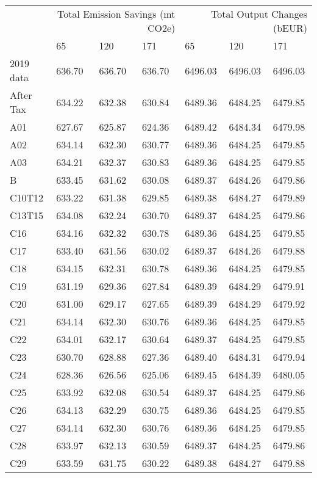 \begin{tabular}{lllllll}
\toprule
 & \multicolumn{3}{r}{Total Emission Savings (mt CO2e)} & \multicolumn{3}{r}{Total Output Changes (bEUR)} \\
 & 65 & 120 & 171 & 65 & 120 & 171 \\
\midrule
2019 data & 636.70 & 636.70 & 636.70 & 6496.03 & 6496.03 & 6496.03 \\
After Tax & 634.22 & 632.38 & 630.84 & 6489.36 & 6484.25 & 6479.85 \\
A01 & 627.67 & 625.87 & 624.36 & 6489.42 & 6484.34 & 6479.98 \\
A02 & 634.14 & 632.30 & 630.77 & 6489.36 & 6484.25 & 6479.85 \\
A03 & 634.21 & 632.37 & 630.83 & 6489.36 & 6484.25 & 6479.85 \\
B & 633.45 & 631.62 & 630.08 & 6489.37 & 6484.26 & 6479.86 \\
C10T12 & 633.22 & 631.38 & 629.85 & 6489.38 & 6484.27 & 6479.89 \\
C13T15 & 634.08 & 632.24 & 630.70 & 6489.37 & 6484.25 & 6479.86 \\
C16 & 634.16 & 632.32 & 630.78 & 6489.36 & 6484.25 & 6479.85 \\
C17 & 633.40 & 631.56 & 630.02 & 6489.37 & 6484.26 & 6479.88 \\
C18 & 634.15 & 632.31 & 630.78 & 6489.36 & 6484.25 & 6479.85 \\
C19 & 631.19 & 629.36 & 627.84 & 6489.39 & 6484.29 & 6479.91 \\
C20 & 631.00 & 629.17 & 627.65 & 6489.39 & 6484.29 & 6479.92 \\
C21 & 634.14 & 632.30 & 630.76 & 6489.36 & 6484.25 & 6479.85 \\
C22 & 634.01 & 632.17 & 630.64 & 6489.37 & 6484.25 & 6479.85 \\
C23 & 630.70 & 628.88 & 627.36 & 6489.40 & 6484.31 & 6479.94 \\
C24 & 628.36 & 626.56 & 625.06 & 6489.45 & 6484.39 & 6480.05 \\
C25 & 633.92 & 632.08 & 630.54 & 6489.37 & 6484.25 & 6479.86 \\
C26 & 634.13 & 632.29 & 630.75 & 6489.36 & 6484.25 & 6479.85 \\
C27 & 634.14 & 632.30 & 630.76 & 6489.36 & 6484.25 & 6479.85 \\
C28 & 633.97 & 632.13 & 630.59 & 6489.37 & 6484.25 & 6479.86 \\
C29 & 633.59 & 631.75 & 630.22 & 6489.38 & 6484.27 & 6479.88 \\

\end{tabular}
